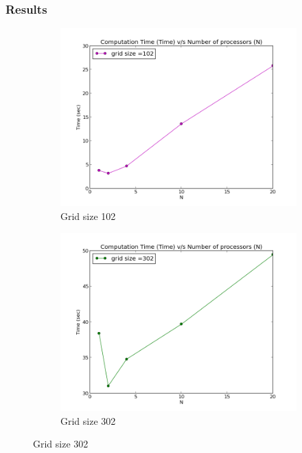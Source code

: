\documentclass{beamer}
\begin{document}
\begin{frame}
\frametitle{Results}
\begin{figure}
\centering 
\begin{subfigure}{0.49\textwidth}
\includegraphics[width=\textwidth]{102}
\caption{Grid size 102}
\end{subfigure}
\begin{subfigure}{0.49\textwidth}
\includegraphics[width=\textwidth]{302}
\caption{Grid size 302}
\end{subfigure}
\end{figure}
\end{frame}
\end{document}
